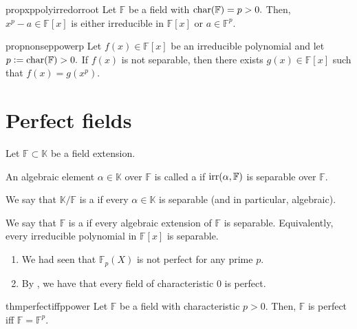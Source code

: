 \begin{restatable}[]{prop}{xppolyirredorroot}
\label{prop:xppolyirredorroot}
    Let $\mathbb{F}$ be a field with $\operatorname{char}(\mathbb{F}) = p > 0.$ Then, $x^p - a \in \mathbb{F}[x]$ is either irreducible in $\mathbb{F}[x]$ or $a \in \mathbb{F}^p.$ \hfill\hyperref[prop:xppolyirredorroot2]{\downsym}
\end{restatable}

\begin{restatable}[]{prop}{nonseppowerp}
\label{prop:nonseppowerp}
    Let $f(x) \in \mathbb{F}[x]$ be an irreducible polynomial and let $p \vcentcolon= \operatorname{char}(\mathbb{F}) > 0.$ If $f(x)$ is not separable, then there exists $g(x) \in \mathbb{F}[x]$ such that $f(x) = g(x^p).$ \hfill\hyperref[prop:nonseppowerp2]{\downsym}
\end{restatable}

\section{Perfect fields}
\begin{defn}%
    Let $\mathbb{F} \subset \mathbb{K}$ be a field extension. 

    An algebraic element $\alpha \in \mathbb{K}$ over $\mathbb{F}$ is called a  if $\operatorname{irr}(\alpha, \mathbb{F})$ is separable over $\mathbb{F}.$

    We say that $\mathbb{K}/\mathbb{F}$ is a  if every $\alpha \in \mathbb{K}$ is separable (and in particular, algebraic). 

    We say that $\mathbb{F}$ is a  if every algebraic extension of $\mathbb{F}$ is separable. Equivalently, every irreducible polynomial in $\mathbb{F}[x]$ is separable.
\end{defn}

\begin{ex}
    \phantom{hi}
    \begin{enumerate}
        \item We had seen that $\mathbb{F}_p(X)$ is not perfect for any prime $p.$
        \item By , we have that every field of characteristic $0$ is perfect.
    \end{enumerate}
\end{ex}

\begin{restatable}[]{thm}{perfectiffppower}
\label{thm:perfectiffppower}
    Let $\mathbb{F}$ be a field with characteristic $p > 0.$ Then, $\mathbb{F}$ is perfect iff $\mathbb{F} = \mathbb{F}^p.$ \hfill\hyperref[thm:perfectiffppower2]{\downsym}
\end{restatable}

